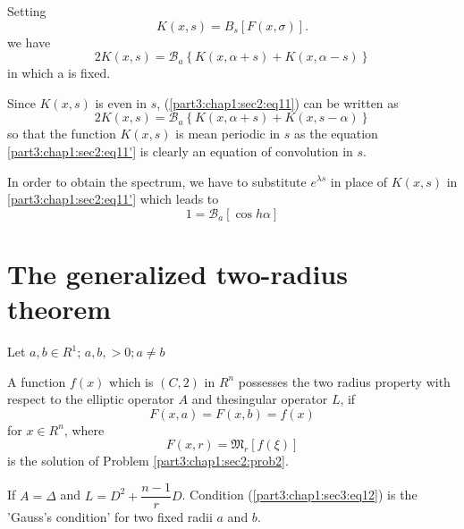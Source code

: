 Setting
$$
K(x, s) = B_s [F(x, \sigma )].
$$
we have
\begin{equation*}
  2 K(x, s) = \mathscr{B}_a \left\{ K(x, \alpha + s) + K(x, \alpha -
  s)\right\} \tag{11}\label{part3:chap1:sec2:eq11} 
\end{equation*}
in which a is fixed.

Since $K(x, s)$ is even in $s$, (\ref{part3:chap1:sec2:eq11}) can be written as 
\begin{equation*}
  2 K(x, s) = \mathscr{B}_a \left\{ K(x, \alpha + s) + K(x, s - \alpha
  ) \right\} \tag*{$(11)'$}\label{part3:chap1:sec2:eq11'} 
\end{equation*}
so that the function $K(x, s)$ is mean periodic in $s$ as the equation
\ref{part3:chap1:sec2:eq11'} is clearly an equation of convolution in $s$. 

\begin{remark*}
  In order to obtain the spectrum, we have to substitute $e^{\lambda
    s}$ in place of $K(x, s)$ in \ref{part3:chap1:sec2:eq11'} which leads to  
  $$
  1 = \mathscr{B}_a [ \cos h \alpha]
  $$
\end{remark*}

\section{The generalized two-radius theorem}\label{part3:chap1:sec3}%

Let $a, b \in R^1$; $a, b, > 0 ; a \neq b$
\setcounter{defn}{1}
\begin{defn}\label{part3:chap1:sec3:def2}%
  A function $f(x)$ which is $(C, 2)$ in $R^n$ possesses the two
  radius property with respect to the elliptic operator $A$ and
  the\pageoriginale singular operator $L$, if  
  \begin{equation*}
    F(x, a) = F(x, b) = f(x) \tag{12}\label{part3:chap1:sec3:eq12}
  \end{equation*}
  for $x \in R^n$, where
  $$
  F(x, r) = \mathfrak{M}_r [f(\xi)]
  $$
  is the solution of Problem \ref{part3:chap1:sec2:prob2}.
\end{defn}

\begin{remark*}
  If $A = \Delta$ and $L = D^2 + \dfrac{n-1}{r}D$. Condition
  (\ref{part3:chap1:sec3:eq12}) is
  the 'Gauss's condition' for two fixed radii $a$ and $b$. 
\end{remark*}

